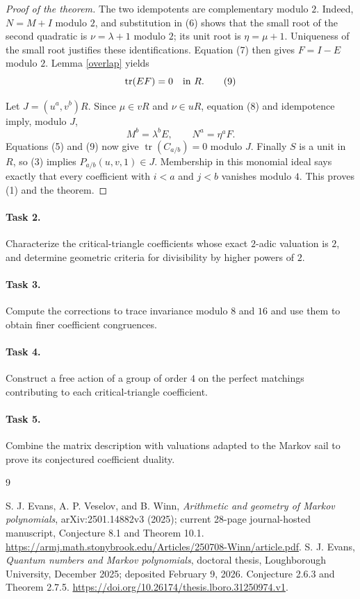 \documentclass[11pt]{article}
\newcommand{\tr}{\operatorname{tr}}
\begin{document}
\begin{proof}[Proof of the theorem]
The two idempotents are complementary modulo $2$.
Indeed, $N=M+I$ modulo $2$, and substitution in (6) shows that
the small root of the second quadratic is
$\nu=\lambda+1$ modulo $2$; its unit root is $\eta=\mu+1$.
Uniqueness of the small root justifies these identifications.
Equation (7) then gives $F=I-E$ modulo $2$.
Lemma \ref{overlap} yields
\[
 \tr(EF)=0\quad\hbox{in }R.
 \tag{9}
\]

Let $J=(u^a,v^b)R$. Since $\mu\in vR$ and $\nu\in uR$,
equation (8) and idempotence imply, modulo $J$,
\[
 M^b=\lambda^bE,\qquad N^a=\eta^aF.
\]
Equations (5) and (9) now give
$\tr(C_{a/b})=0$ modulo $J$.
Finally $S$ is a unit in $R$, so (3) implies
$P_{a/b}(u,v,1)\in J$.
Membership in this monomial ideal says exactly that every coefficient
with $i<a$ and $j<b$ vanishes modulo $4$.
This proves (1) and the theorem.
\end{proof}

\paragraph{Task 2.}
Characterize the critical-triangle coefficients whose exact
$2$-adic valuation is $2$, and determine geometric criteria for
divisibility by higher powers of $2$.

\paragraph{Task 3.}
Compute the corrections to trace invariance modulo $8$ and $16$
and use them to obtain finer coefficient congruences.

\paragraph{Task 4.}
Construct a free action of a group of order $4$ on the perfect
matchings contributing to each critical-triangle coefficient.

\paragraph{Task 5.}
Combine the matrix description with valuations adapted to the
Markov sail to prove its conjectured coefficient duality.

\begin{thebibliography}{9}
\raggedright
{}
S. J. Evans, A. P. Veselov, and B. Winn,
\emph{Arithmetic and geometry of Markov polynomials},
arXiv:2501.14882v3 (2025); current 28-page journal-hosted manuscript,
Conjecture 8.1 and Theorem 10.1.
\url{https://armj.math.stonybrook.edu/Articles/250708-Winn/article.pdf}.
S. J. Evans, \emph{Quantum numbers and Markov polynomials},
doctoral thesis, Loughborough University, December 2025;
deposited February 9, 2026. Conjecture 2.6.3 and Theorem 2.7.5.
\url{https://doi.org/10.26174/thesis.lboro.31250974.v1}.
\end{thebibliography}
\end{document}
